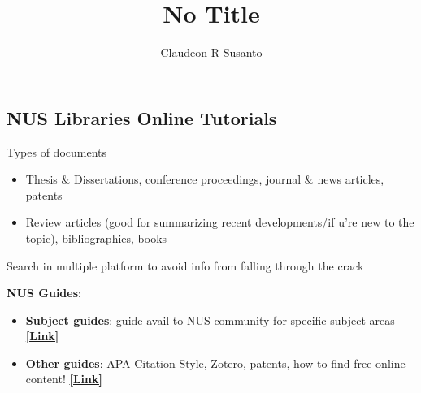 \documentclass{article}
\title{No Title}
\author{Claudeon R Susanto}
\date{}
\begin{document}
{}\selectfont
\begin{multicols}{2}
\section{NUS Libraries Online Tutorials}

Types of documents
\begin{itemize}
	\item Thesis \& Dissertations, conference proceedings, journal \& news articles, patents
	\item Review articles (good for summarizing recent developments/if u're new to the topic), bibliographies, books
\end{itemize}

Search in multiple platform to avoid info from falling through the crack

\textbf{NUS Guides}:
\begin{itemize}
	\item \textbf{Subject guides}: guide avail to NUS community for specific subject areas \href{https://libguides.nus.edu.sg/?sg=s}{\textbf{[Link]}}
	\item \textbf{Other guides}: APA Citation Style, Zotero, patents, how to find free online content! \href{https://libguides.nus.edu.sg/?b=t}{\textbf{[Link]}}
\end{itemize}

\end{multicols}
\end{document}
